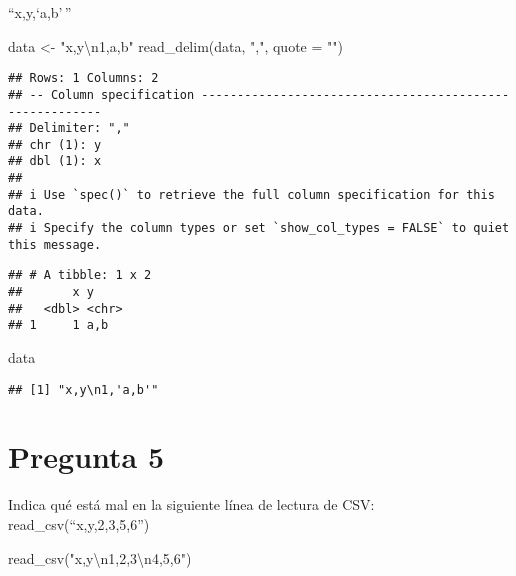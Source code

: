 \documentclass[
]{article}
\newenvironment{Shaded}{\begin{snugshade}}{\end{snugshade}}
\newcommand{\AttributeTok}[1]{\textcolor[rgb]{0.77,0.63,0.00}{#1}}
\newcommand{\FunctionTok}[1]{\textcolor[rgb]{0.00,0.00,0.00}{#1}}
\newcommand{\NormalTok}[1]{#1}
\newcommand{\OtherTok}[1]{\textcolor[rgb]{0.56,0.35,0.01}{#1}}
\newcommand{\SpecialCharTok}[1]{\textcolor[rgb]{0.00,0.00,0.00}{#1}}
\newcommand{\StringTok}[1]{\textcolor[rgb]{0.31,0.60,0.02}{#1}}
\begin{document}
``x,y,`a,b'\,''

\begin{Shaded}
\begin{Highlighting}[]
\NormalTok{data }\OtherTok{\textless{}{-}} \StringTok{"x,y}\SpecialCharTok{\textbackslash{}n}\StringTok{1,\textquotesingle{}a,b\textquotesingle{}"}
\FunctionTok{read\_delim}\NormalTok{(data, }\StringTok{","}\NormalTok{, }\AttributeTok{quote =} \StringTok{"\textquotesingle{}"}\NormalTok{)}
\end{Highlighting}
\end{Shaded}

\begin{verbatim}
## Rows: 1 Columns: 2
## -- Column specification --------------------------------------------------------
## Delimiter: ","
## chr (1): y
## dbl (1): x
## 
## i Use `spec()` to retrieve the full column specification for this data.
## i Specify the column types or set `show_col_types = FALSE` to quiet this message.
\end{verbatim}

\begin{verbatim}
## # A tibble: 1 x 2
##       x y    
##   <dbl> <chr>
## 1     1 a,b
\end{verbatim}

\begin{Shaded}
\begin{Highlighting}[]
\NormalTok{data}
\end{Highlighting}
\end{Shaded}

\begin{verbatim}
## [1] "x,y\n1,'a,b'"
\end{verbatim}

\hypertarget{pregunta-5}{%
\section{Pregunta 5}\label{pregunta-5}}

Indica qué está mal en la siguiente línea de lectura de CSV:
read\_csv(``x,y,2,3,5,6'')

\begin{Shaded}
\begin{Highlighting}[]
\FunctionTok{read\_csv}\NormalTok{(}\StringTok{"x,y}\SpecialCharTok{\textbackslash{}n}\StringTok{1,2,3}\SpecialCharTok{\textbackslash{}n}\StringTok{4,5,6"}\NormalTok{)}
\end{Highlighting}
\end{Shaded}
\end{document}

